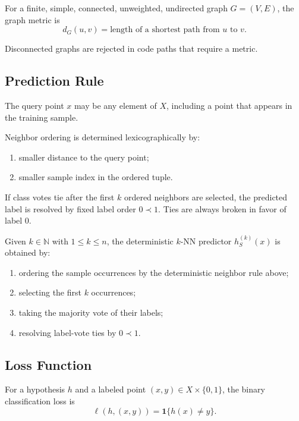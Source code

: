 \begin{definition}
For a finite, simple, connected, unweighted, undirected graph $G = (V, E)$, the graph metric is
\[
d_G(u, v) = \text{length of a shortest path from } u \text{ to } v.
\]
\end{definition}

Disconnected graphs are rejected in code paths that require a metric.

\subsection{Prediction Rule}

The query point $x$ may be any element of $X$, including a point that appears in the training sample.

\begin{note}
Neighbor ordering is determined lexicographically by:
\begin{enumerate}
    \item smaller distance to the query point;
    \item smaller sample index in the ordered tuple.
\end{enumerate}
If class votes tie after the first $k$ ordered neighbors are selected, the predicted label is resolved by fixed label order $0 \prec 1$. Ties are always broken in favor of label $0$.
\end{note}

\begin{definition}[$k$-NN Prediction]
\label{def:knn-prediction}
Given $k \in \mathbb{N}$ with $1 \le k \le n$, the deterministic $k$-NN predictor $h_S^{(k)}(x)$ is obtained by:
\begin{enumerate}
    \item ordering the sample occurrences by the deterministic neighbor rule above;
    \item selecting the first $k$ occurrences;
    \item taking the majority vote of their labels;
    \item resolving label-vote ties by $0 \prec 1$.
\end{enumerate}
\end{definition}

\subsection{Loss Function}

\begin{definition}
For a hypothesis $h$ and a labeled point $(x, y) \in X \times \{0,1\}$, the binary classification loss is
\[
\ell(h, (x, y)) = \mathbf{1}\{h(x) \ne y\}.
\]
\end{definition}

